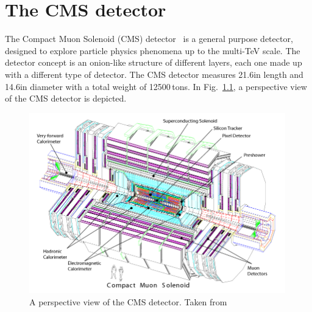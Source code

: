 \FloatBarrier
\chapter{The CMS detector}
The Compact Muon Solenoid (CMS) detector~\cite{bib:CMS:experiment,bib:CMS:TDR} is a general purpose detector, designed to explore particle physics phenomena up to the multi-TeV scale.
The detector concept is an onion-like structure of different layers, each one made up with a different type of detector. 
The CMS detector measures 21.6\m in length and 14.6\m in diameter with a total weight of 12500\,tons.
In Fig.~\ref{fig:CMSdetector}, a perspective view of the CMS detector is depicted. 
\begin{figure}[!b]
  \centering
      \includegraphics[width=0.99\textwidth]{figures/experiment/CMS/cms_complete_labelled.png}
  \caption{A perspective view of the CMS detector. Taken from~\cite{bib:CMS:experiment}}  
  \label{fig:CMSdetector}
\end{figure}

